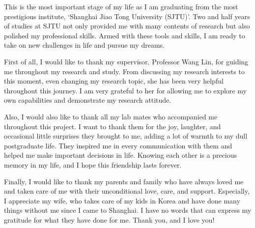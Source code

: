 \begin{thanks}
	
This is the most important stage of my life as I am graduating from the most prestigious institute, `Shanghai Jiao Tong University (SJTU)'. Two and half years of studies at SJTU not only provided me with many contents of research but also polished my professional skills. Armed with these tools and skills, I am ready to take on new challenges in life and pursue my dreams.

First of all, I would like to thank my supervisor, Professor Wang Lin, for guiding me throughout my research and study. From discussing my research interests to this moment, even changing my research topic, she has been very helpful throughout this journey. I am very grateful to her for allowing me to explore my own capabilities and demonstrate my research attitude.

Also, I would also like to thank all my lab mates who accompanied me throughout this project. I want to thank them for the joy, laughter, and occasional little surprises they brought to me, adding a lot of warmth to my dull postgraduate life. They inspired me in every communication with them and helped me make important decisions in life. Knowing each other is a precious memory in my life, and I hope this friendship lasts forever.

Finally, I would like to thank my parents and family who have always loved me and taken care of me with their unconditional love, care, and support. Especially, I appreciate my wife, who takes care of my kids in Korea and have done many things without me since I came to Shanghai. I have no words that can express my gratitude for what they have done for me. Thank you, and I love you!

\end{thanks}
